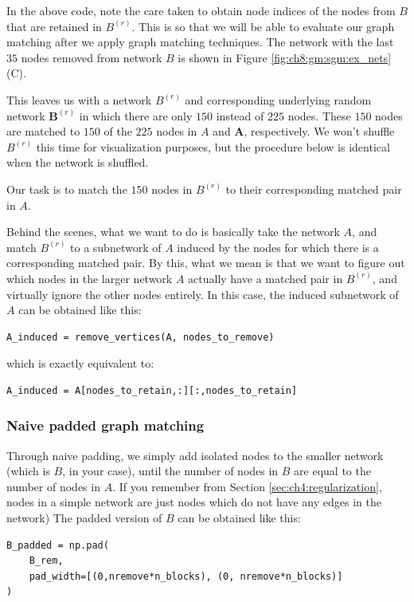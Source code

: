 In the above code, note the care taken to obtain node indices of the nodes from $B$ that are retained in $B^{(r)}$. This is so that we will be able to evaluate our graph matching after we apply graph matching techniques. The network with the last $35$ nodes removed from network $B$ is shown in Figure \ref{fig:ch8:gm:sgm:ex_nets}(C).

This leaves us with a network $B^{(r)}$ and corresponding underlying random network $\mathbf B^{(r)}$ in which there are only $150$ instead of $225$ nodes. These $150$ nodes are matched to $150$ of the $225$ nodes in $A$ and $\mathbf A$, respectively. We won't shuffle $B^{(r)}$ this time for visualization purposes, but the procedure below is identical when the network is shuffled.

Our task is to match the $150$ nodes in $B^{(r)}$ to their corresponding matched pair in $A$.

Behind the scenes, what we want to do is basically take the network $A$, and match $B^{(r)}$ to a subnetwork of $A$ induced by the nodes for which there is a corresponding matched pair. By this, what we mean is that we want to figure out which nodes in the larger network $A$ actually have a matched pair in $B^{(r)}$, and virtually ignore the other nodes entirely. In this case, the induced subnetwork of $A$ can be obtained like this:

\begin{lstlisting}[style=python]
A_induced = remove_vertices(A, nodes_to_remove)
\end{lstlisting}

which is exactly equivalent to:

\begin{lstlisting}[style=python]
A_induced = A[nodes_to_retain,:][:,nodes_to_retain]
\end{lstlisting}

\subsubsection*{Naive padded graph matching}

Through naive padding, we simply add isolated nodes to the smaller network (which is $B$, in your case), until the number of nodes in $B$ are equal to the number of nodes in $A$. If you remember from Section \ref{sec:ch4:regularization}, nodes in a simple network are just nodes which do not have any edges in the network) The padded version of $B$ can be obtained like this:

\begin{lstlisting}[style=python]
B_padded = np.pad(
    B_rem, 
    pad_width=[(0,nremove*n_blocks), (0, nremove*n_blocks)]
)
\end{lstlisting}

